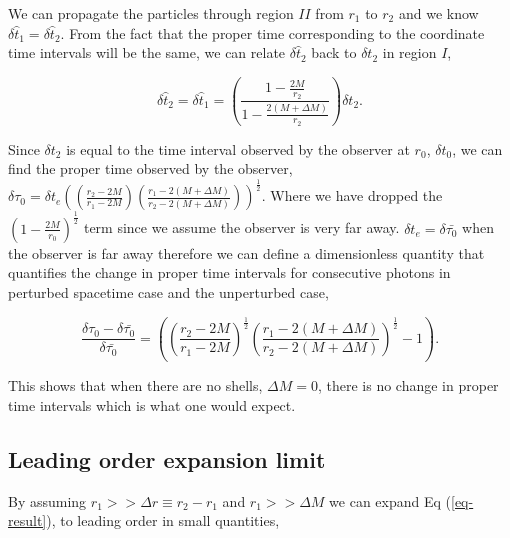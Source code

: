 \documentclass[aps,showpacs,onecolumn,floats,prd,superscriptaddress,nofootinbib]{revtex4-1}
\begin{document}
We can propagate the particles through region $II$ from $r_1$ to $r_2$ and we know $\delta \hat{t}_1 = \delta \hat{t}_2$. From the fact that the proper time corresponding to the coordinate time intervals will be the same, we can relate $\delta \hat{t}_2$ back to $\delta t_2$ in region $I$, 

\begin{equation}
	\delta \hat{t}_2 = \delta \hat{t}_1= \left( \frac{1 - \frac{2M}{r_2}}{1 - \frac{2(M + \Delta M)}{r_2}} \right) \delta t_2.	\label{7}
\end{equation}

Since $\delta t_2$ is equal to the time interval observed by the observer at $r_0$, $\delta t_0$, we can find the proper time observed by the observer, $\delta \tau_0  = \delta t_e \left( \left( \frac{r_2 - 2M}{r_1 - 2M} \right) \left( \frac{r_1 - 2(M+\Delta M)}{r_2 - 2(M + \Delta M)} \right) \right)^\frac{1}{2}$. Where we have dropped the $\left( 1 - \frac{2M}{r_0} \right)^\frac{1}{2}$ term since we assume the observer is very far away. $\delta t_e = \delta \bar{\tau_0}$ when the observer is far away therefore we can define a dimensionless quantity that quantifies the change in proper time intervals for consecutive photons in perturbed spacetime case and the unperturbed case, 

\begin{equation}
	 \frac{\delta \tau_0 - \delta \bar{\tau_0}}{\delta \bar{\tau_0}} = \left( \left( \frac{r_2 - 2M}{r_1 - 2M} \right)^\frac{1}{2} \left( \frac{r_1 - 2(M+\Delta M)}{r_2 - 2(M+\Delta M)} \right)^\frac{1}{2} - 1\right).	\label{10}
\end{equation}

This shows that when there are no shells, $\Delta M = 0$, there is no change in proper time intervals which is what one would expect. 

\subsection{Leading order expansion limit}

By assuming $r_1>> \Delta r \equiv r_2 - r_1$ and $r_1>> \Delta M$ we can expand Eq (\ref{eq-result}), to leading order in small quantities,
\end{document}
